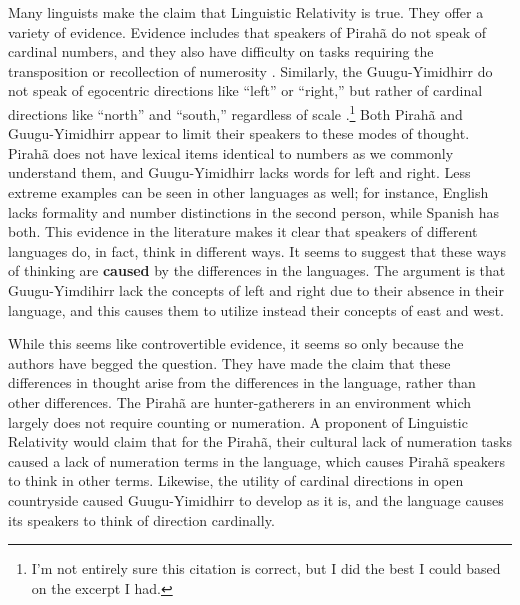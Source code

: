 \documentclass[man,12pt,natbib]{apa6}
\begin{document}
Many linguists make the claim that Linguistic Relativity is true. 
They offer a variety of evidence. Evidence includes that speakers of Pirah\~{a}
do not speak of cardinal numbers, and they also have difficulty on tasks
requiring the transposition or recollection of numerosity \cite{Everett12}.
Similarly, the Guugu-Yimidhirr do not speak of egocentric directions like
``left'' or ``right,'' but rather of cardinal directions like ``north'' and
``south,'' regardless of scale \cite{Foley97}.\footnote{I'm not entirely sure
this citation is correct, but I did the best I could based on the excerpt I
had.} Both Pirah\~{a} and Guugu-Yimidhirr appear to limit their speakers to
these modes of thought. Pirah\~{a} does not have lexical items identical to
numbers as we commonly understand them, and Guugu-Yimidhirr lacks words for
left and right. 
Less extreme examples can be seen in other languages as well; for instance,
English lacks formality and number distinctions in the second person, while
Spanish has both. 
This evidence in the literature makes it clear that speakers of different
languages do, in fact, think in different ways. It seems to suggest that these
ways of thinking are \textbf{caused} by the differences in the languages. The
argument is that Guugu-Yimdihirr lack the concepts of left and right due to
their absence in their language, and this causes them 
to utilize instead their concepts of east and west.

While this seems like controvertible evidence, 
it seems so only because the authors have begged the question. They have made
the claim that these differences in thought arise from the differences in the
language, rather than other differences. The Pirah\~{a} are hunter-gatherers in
an environment which largely does not require counting or numeration. A
proponent of Linguistic Relativity would claim that for the Pirahã, their
cultural lack of numeration tasks caused a lack of numeration terms in the
language, which causes Pirahã speakers to think in other terms. Likewise, the
utility of cardinal directions in open countryside caused Guugu-Yimidhirr to
develop as it is, and the language causes its speakers to think of direction
cardinally.
\end{document}
